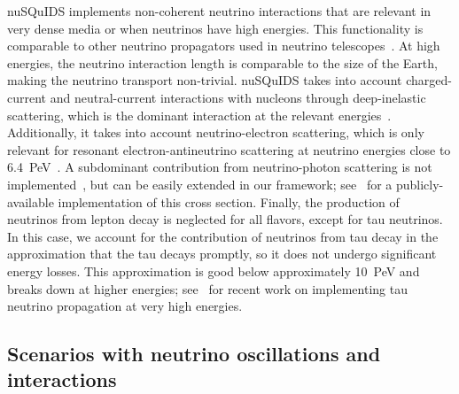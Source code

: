 \documentclass[3p,12pt]{elsarticle}
\newcommand{\ttf}{\ttfamily}
\begin{document}
{\ttf nuSQuIDS} implements non-coherent neutrino interactions that are relevant in very dense media or when neutrinos have high energies.
This functionality is comparable to other neutrino propagators used in neutrino telescopes~\cite{Safa:2021ghs,Garcia:2020jwr,Vincent:2017svp,Yoshida:2003js,shigeruyoshida_2020_4018117,Gazizov:2004va,DeYoung:865626,Alvarez-Muniz:2018owm,NuSpaceSim:2021hgs}.
At high energies, the neutrino interaction length is comparable to the size of the Earth, making the neutrino transport non-trivial.
{\ttf nuSQuIDS} takes into account charged-current and neutral-current interactions with nucleons through deep-inelastic scattering, which is the dominant interaction at the relevant energies~\citep{Formaggio:2012cpf,Gandhi:1998ri,Zhou:2019frk,Zhou:2019vxt,CooperSarkar:2011pa}.
Additionally, it takes into account neutrino-electron scattering, which is only relevant for resonant electron-antineutrino scattering at neutrino energies close to 6.4~PeV~\cite{Glashow:1960zz}.
A subdominant contribution from neutrino-photon scattering is not implemented~\cite{Seckel:1997kk,Alikhanov:2014uja,Alikhanov:2015kla,Zhou:2019frk,Zhou:2019vxt}, but can be easily extended in our framework; see~\cite{Garcia:2020jwr} for a publicly-available implementation of this cross section.
Finally, the production of neutrinos from lepton decay is neglected for all flavors, except for tau neutrinos.
In this case, we account for the contribution of neutrinos from tau decay in the approximation that the tau decays promptly, so it does not undergo significant energy losses.
This approximation is good below approximately 10~PeV and breaks down at higher energies; see~\cite{Safa:2021ghs,Garcia:2020jwr,NuSpaceSim:2021hgs} for recent work on implementing tau neutrino propagation at very high energies.

\subsection{Scenarios with neutrino oscillations and interactions}
\end{document}
